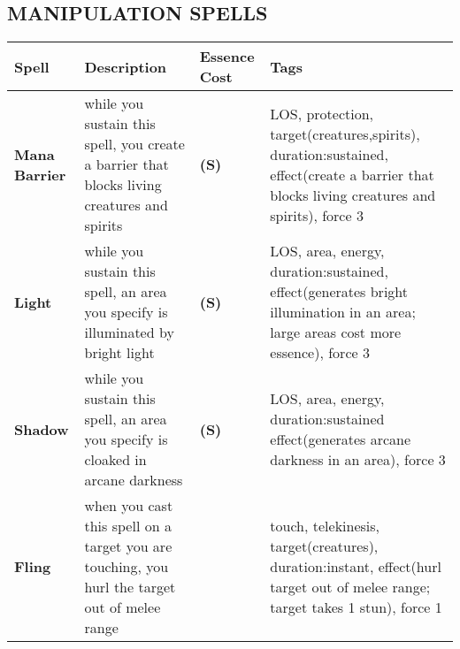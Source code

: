 \documentclass[oneside,10pt]{article}
\begin{document}
\subsection{MANIPULATION SPELLS}
\begin{tabular}{>{\bfseries}m{.1\linewidth}m{.34\linewidth}>{\bfseries\centering}m{.11\linewidth}m{.35\linewidth}}
Spell& \textbf{Description}&Essence Cost&\textbf{Tags}\\\midrule
Mana \mbox{Barrier}& while you sustain this spell, you create a barrier that blocks living creatures and spirits& 3(S) & LOS, protection, target(creatures,spirits), duration:sustained, effect(create a barrier that blocks living creatures
and spirits), force 3\\
Light& while you sustain this spell, an area you specify is illuminated by bright light& 3(S)& LOS, area,
energy, duration:sustained, effect(generates bright illumination in an area; large areas cost more essence),
force 3\\
Shadow& while you sustain this spell, an area you specify
is cloaked in arcane darkness&3(S) &LOS, area, energy, duration:sustained effect(generates arcane
darkness in an area), force 3\\
Fling& when you cast this spell on a target you are touching,
you hurl the target out of melee range& 1& touch, telekinesis, target(creatures), duration:instant, effect(hurl target out of melee range; target takes 1
stun), force 1\\
\bottomrule
\end{tabular}
\end{document}
